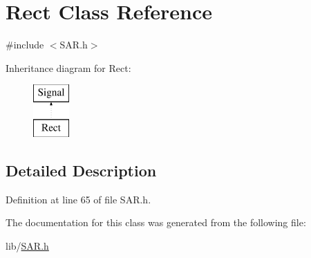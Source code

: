 \hypertarget{class_rect}{}\section{Rect Class Reference}
\label{class_rect}


{\ttfamily \#include $<$S\+A\+R.\+h$>$}

Inheritance diagram for Rect\+:\begin{figure}[H]
\begin{center}
\leavevmode
\includegraphics[height=2.000000cm]{class_rect}
\end{center}
\end{figure}


\subsection{Detailed Description}


Definition at line 65 of file S\+A\+R.\+h.



The documentation for this class was generated from the following file\+:\begin{DoxyCompactItemize}
\item 
lib/\hyperlink{_s_a_r_8h}{S\+A\+R.\+h}\end{DoxyCompactItemize}
